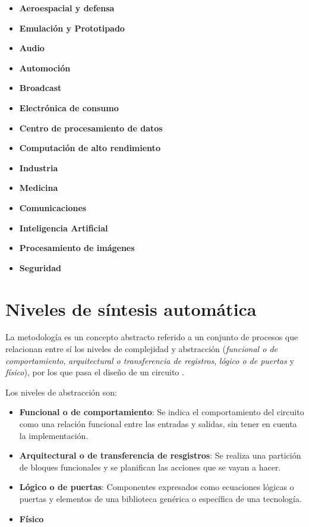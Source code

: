\begin{itemize}
    \item \textbf{Aeroespacial y defensa} 
    \item \textbf{Emulación y Prototipado}
    \item \textbf{Audio} 
    \item \textbf{Automoción} 
    \item \textbf{Broadcast} 
    \item \textbf{Electrónica de consumo} 
    \item \textbf{Centro de procesamiento de datos} 
    \item \textbf{Computación de alto rendimiento} 
    \item \textbf{Industria} 
    \item \textbf{Medicina} 
    \item \textbf{Comunicaciones}
    \item \textbf{Inteligencia Artificial}
    \item \textbf{Procesamiento de imágenes}
    \item \textbf{Seguridad}
\end{itemize}

\section{Niveles de síntesis automática}
La metodología es un concepto abstracto referido a un conjunto de procesos que relacionan entre sí los niveles de complejidad y abstracción 
(\textit{funcional o de comportamiento}, \textit{arquitectural o transferencia de registros}, \textit{lógico o de puertas} y 
\textit{físico}), por los que pasa el diseño de un circuito \cite{teres1997vhdl}.

Los niveles de abstracción son:

\begin{itemize}
    \item \textbf{Funcional o de comportamiento}: Se indica el comportamiento del circuito como una relación funcional entre las entradas 
    y salidas, sin tener en cuenta la implementación.
    \item \textbf{Arquitectural o de transferencia de resgistros}: Se realiza una partición de bloques funcionales y se planifican las 
    acciones que se vayan a hacer. 
    \item \textbf{Lógico o de puertas}: Componentes expresados como ecuaciones lógicas o puertas y elementos de una biblioteca genérica o 
    específica de una tecnología.
    \item \textbf{Físico}
\end{itemize}


